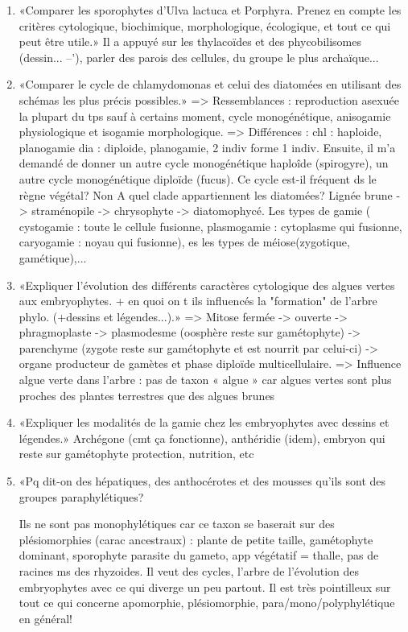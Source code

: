 \begin{enumerate}
	\item «Comparer les sporophytes d’Ulva lactuca et Porphyra. Prenez en compte les critères cytologique, biochimique, morphologique, écologique, et tout ce qui peut être utile.» Il a appuyé sur les thylacoïdes et des phycobilisomes (dessin... --'), parler des parois des cellules, du groupe le plus archaïque...

	\item «Comparer le cycle de chlamydomonas et celui des diatomées en utilisant des schémas les plus précis possibles.»
 => Ressemblances : reproduction asexuée la plupart du tps sauf à certains moment, cycle monogénétique, anisogamie physiologique et isogamie morphologique.
 => Différences : chl : haploide, planogamie dia : diploide, planogamie, 2 indiv forme 1 indiv. 
Ensuite, il m'a demandé de donner un autre cycle monogénétique haploîde (spirogyre), un autre cycle monogénétique diploïde (fucus). 
Ce cycle est-il fréquent ds le règne végétal? Non
 A quel clade appartiennent les diatomées? Lignée brune  -> straménopile -> chrysophyte -> diatomophycé. Les types de gamie ( cystogamie : toute le cellule fusionne, plasmogamie : cytoplasme qui fusionne, caryogamie : noyau qui fusionne),  es les types de méiose(zygotique, gamétique),...

	\item «Expliquer l'évolution des différents caractères  cytologique des algues vertes aux embryophytes. + en quoi on t ils influencés la "formation" de l'arbre phylo. (+dessins et légendes...).»
=> Mitose fermée -> ouverte -> phragmoplaste -> plasmodesme (oosphère reste sur gamétophyte) -> parenchyme (zygote reste sur gamétophyte et est nourrit par celui-ci) -> organe producteur de gamètes et phase diploïde multicellulaire.
=> Influence algue verte dans l’arbre : pas de taxon « algue » car algues vertes sont plus proches des plantes terrestres que des algues brunes

	\item «Expliquer les modalités de la gamie chez les embryophytes avec dessins et légendes.» Archégone (cmt ça fonctionne), anthéridie (idem), embryon qui reste sur gamétophyte protection, nutrition, etc

	\item «Pq dit-on des hépatiques, des anthocérotes et des mousses qu'ils sont des groupes paraphylétiques?

Ils ne sont pas monophylétiques car ce taxon se baserait sur des plésiomorphies (carac ancestraux) : plante de petite taille, gamétophyte dominant, sporophyte parasite du gameto, app végétatif = thalle, pas de racines ms des rhyzoides. Il veut des cycles, l'arbre de l'évolution des embryophytes avec ce qui diverge un peu partout. Il est très pointilleux sur tout ce qui concerne apomorphie, plésiomorphie, para/mono/polyphylétique en général!


\end{enumerate}
